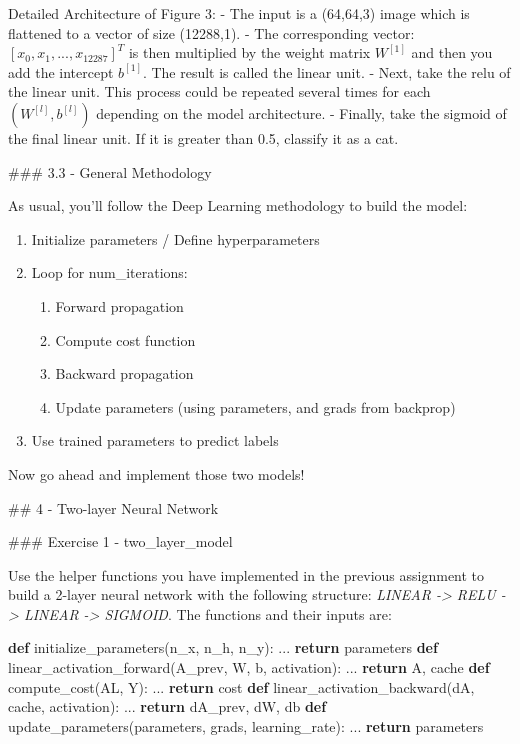\documentclass[11pt]{article}
\providecommand{\tightlist}{%
      \setlength{\itemsep}{0pt}\setlength{\parskip}{0pt}}
\newenvironment{Shaded}{}{}
\newcommand{\KeywordTok}[1]{\textcolor[rgb]{0.00,0.44,0.13}{\textbf{{#1}}}}
\newcommand{\NormalTok}[1]{{#1}}
\newcommand{\ControlFlowTok}[1]{\textcolor[rgb]{0.00,0.44,0.13}{\textbf{{#1}}}}
\begin{document}
Detailed Architecture of Figure 3: - The input is a (64,64,3) image
which is flattened to a vector of size (12288,1). - The corresponding
vector: \([x_0,x_1,...,x_{12287}]^T\) is then multiplied by the weight
matrix \(W^{[1]}\) and then you add the intercept \(b^{[1]}\). The
result is called the linear unit. - Next, take the relu of the linear
unit. This process could be repeated several times for each
\((W^{[l]}, b^{[l]})\) depending on the model architecture. - Finally,
take the sigmoid of the final linear unit. If it is greater than 0.5,
classify it as a cat.

\#\#\# 3.3 - General Methodology

As usual, you'll follow the Deep Learning methodology to build the
model:

\begin{enumerate}
\def\labelenumi{\arabic{enumi}.}
\tightlist
\item
  Initialize parameters / Define hyperparameters
\item
  Loop for num\_iterations:

  \begin{enumerate}
  \def\labelenumii{\alph{enumii}.}
  \tightlist
  \item
    Forward propagation
  \item
    Compute cost function
  \item
    Backward propagation
  \item
    Update parameters (using parameters, and grads from backprop)
  \end{enumerate}
\item
  Use trained parameters to predict labels
\end{enumerate}

Now go ahead and implement those two models!

    \#\# 4 - Two-layer Neural Network

\#\#\# Exercise 1 - two\_layer\_model

Use the helper functions you have implemented in the previous assignment
to build a 2-layer neural network with the following structure:
\emph{LINEAR -\textgreater{} RELU -\textgreater{} LINEAR -\textgreater{}
SIGMOID}. The functions and their inputs are:

\begin{Shaded}
\begin{Highlighting}[]
\KeywordTok{def}\NormalTok{ initialize\_parameters(n\_x, n\_h, n\_y):}
\NormalTok{    ...}
    \ControlFlowTok{return}\NormalTok{ parameters }
\KeywordTok{def}\NormalTok{ linear\_activation\_forward(A\_prev, W, b, activation):}
\NormalTok{    ...}
    \ControlFlowTok{return}\NormalTok{ A, cache}
\KeywordTok{def}\NormalTok{ compute\_cost(AL, Y):}
\NormalTok{    ...}
    \ControlFlowTok{return}\NormalTok{ cost}
\KeywordTok{def}\NormalTok{ linear\_activation\_backward(dA, cache, activation):}
\NormalTok{    ...}
    \ControlFlowTok{return}\NormalTok{ dA\_prev, dW, db}
\KeywordTok{def}\NormalTok{ update\_parameters(parameters, grads, learning\_rate):}
\NormalTok{    ...}
    \ControlFlowTok{return}\NormalTok{ parameters}
\end{Highlighting}
\end{Shaded}
\end{document}
